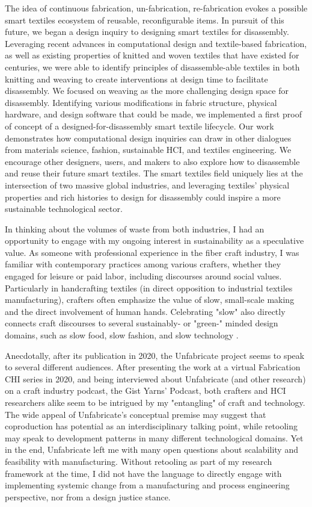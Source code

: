 The idea of continuous fabrication, un-fabrication, re-fabrication evokes a possible smart textiles ecosystem of reusable, reconfigurable items. In pursuit of this future, we began a design inquiry to designing smart textiles for disassembly. Leveraging recent advances in computational design and textile-based fabrication, as well as existing properties of knitted and woven textiles that have existed for centuries, we were able to identify principles of disassemble-able textiles in both knitting and weaving to create interventions at design time to facilitate disassembly. We focused on weaving as the more challenging design space for disassembly. Identifying various modifications in fabric structure, physical hardware, and design software that could be made, we implemented a first proof of concept of a designed-for-disassembly smart textile lifecycle. Our work demonstrates how computational design inquiries can draw in other dialogues from materials science, fashion, sustainable HCI, and textiles engineering. We encourage other designers, users, and makers to also explore how to disassemble and reuse their future smart textiles. The smart textiles field uniquely lies at the intersection of two massive global industries, and leveraging textiles' physical properties and rich histories to design for disassembly could inspire a more sustainable technological sector. 

In thinking about the volumes of waste from both industries, I had an opportunity to engage with my ongoing interest in sustainability as a speculative value. As someone with professional experience in the fiber craft industry, I was familiar with contemporary practices among various crafters, whether they engaged for leisure or paid labor, including discourses around social values. Particularly in handcrafting textiles (in direct opposition to industrial textiles manufacturing), crafters often emphasize the value of slow, small-scale making and the direct involvement of human hands. Celebrating "slow" also directly connects craft discourses to several sustainably- or "green-" minded design domains, such as slow food, slow fashion, and slow technology \todo{[comps 52,105,111]}.

Anecdotally, after its publication in 2020, the Unfabricate project seems to speak to several different audiences. After presenting the work at a virtual Fabrication \@ CHI series in 2020, and being interviewed about Unfabricate (and other research) on a craft industry podcast, the Gist Yarns' Podcast, both crafters and HCI researchers alike seem to be intrigued by my "entangling" of craft and technology. The wide appeal of Unfabricate's conceptual premise may suggest that coproduction has potential as an interdisciplinary talking point, while retooling may speak to development patterns in many different technological domains. Yet in the end, Unfabricate left me with many open questions about scalability and feasibility with manufacturing. Without retooling as part of my research framework at the time, I did not have the language to directly engage with implementing systemic change from a manufacturing and process engineering perspective, nor from a design justice stance.